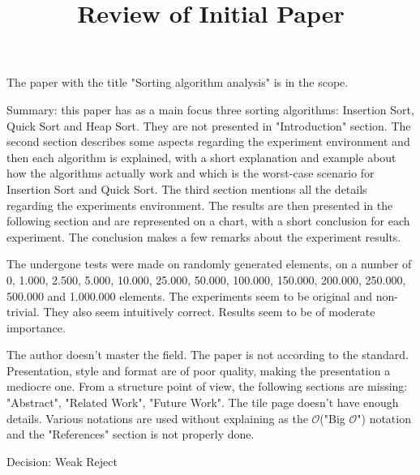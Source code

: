 \documentclass[]{article}
\title{Review of Initial Paper}
\date{}
\begin{document}
	
	
\maketitle

The paper with the title "Sorting algorithm analysis" is in the scope.

Summary: this paper has as a main focus three sorting algorithms: Insertion Sort, Quick Sort and Heap Sort. They are not presented in "Introduction" section. The second section describes some aspects regarding the experiment environment and then each algorithm is explained, with a short explanation and example about how the algorithms actually work and which is the worst-case scenario for Insertion Sort and Quick Sort. The third section mentions all the details regarding the experiments environment. The results are then presented in the following section and are represented on a chart, with a short conclusion for each experiment. The conclusion makes a few remarks about the experiment results.

The undergone tests were made on randomly generated elements, on a number of 0, 1.000, 2.500, 5.000, 10.000, 25.000, 50.000, 100.000, 150.000, 200.000, 250.000, 500.000 and 1.000.000 elements. The experiments seem to be original and non-trivial. They also seem intuitively correct. Results seem to be of moderate importance.

The author doesn't master the field. The paper is not according to the standard. Presentation, style and format are of poor quality, making the presentation a mediocre one. From a structure point of view, the following sections are missing: "Abstract", "Related Work", "Future Work". The tile page doesn't have enough details. Various notations are used without explaining as the $\mathcal{O}$("Big $\mathcal{O}$") notation and the "References" section is not properly done.

Decision: Weak Reject
\end{document}
